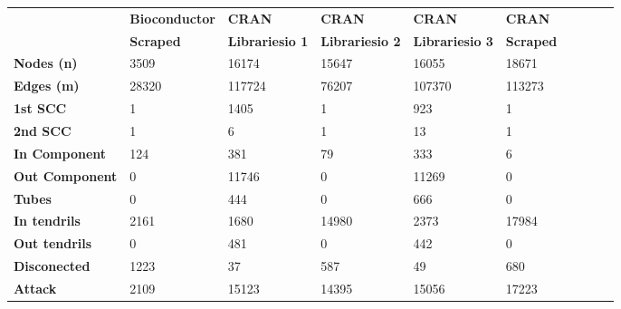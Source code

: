 \begin{table}[h!]
    \centering
    \label{tab:data_bc_cran}
    \tiny
    \begin{tabular}{|l|l|l|l|l|l|l|l|l|l|}
        \hline
        \textbf{}              & \textbf{Bioconductor} & \textbf{CRAN}          & \textbf{CRAN}          & \textbf{CRAN}          & \textbf{CRAN}    \\
                               & \textbf{Scraped}      & \textbf{Librariesio 1} & \textbf{Librariesio 2} & \textbf{Librariesio 3} & \textbf{Scraped} \\
        \hline
        \textbf{Nodes (n)}     & 3509                  & 16174                  & 15647                  & 16055                  & 18671            \\
        \textbf{Edges (m)}     & 28320                 & 117724                 & 76207                  & 107370                 & 113273           \\
        \textbf{1st SCC}       & 1                     & 1405                   & 1                      & 923                    & 1                \\
        \textbf{2nd SCC}       & 1                     & 6                      & 1                      & 13                     & 1                \\
        \textbf{In Component}  & 124                   & 381                    & 79                     & 333                    & 6                \\
        \textbf{Out Component} & 0                     & 11746                  & 0                      & 11269                  & 0                \\
        \textbf{Tubes}         & 0                     & 444                    & 0                      & 666                    & 0                \\
        \textbf{In tendrils}   & 2161                  & 1680                   & 14980                  & 2373                   & 17984            \\
        \textbf{Out tendrils}  & 0                     & 481                    & 0                      & 442                    & 0                \\
        \textbf{Disconected}   & 1223                  & 37                     & 587                    & 49                     & 680              \\
        \textbf{Attack}        & 2109                  & 15123                  & 14395                  & 15056                  & 17223            \\

\end{tabular}
\end{table}
